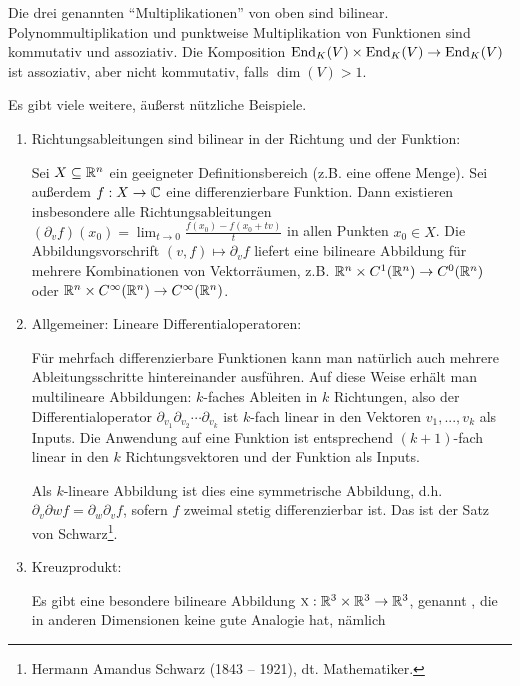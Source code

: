\begin{example}
Die drei genannten \enquote{Multiplikationen} von oben sind bilinear. Polynommultiplikation und punktweise Multiplikation von Funktionen sind kommutativ und assoziativ. Die Komposition $\operatorname{End}_K(V)\times\operatorname{End}_K(V)\to\operatorname{End}_K(V)$ ist assoziativ, aber nicht kommutativ, falls $\dim(V) > 1$.

Es gibt viele weitere, äußerst nützliche Beispiele.
\begin{enumerate}[start=4]
	\item Richtungsableitungen sind bilinear in der Richtung und der Funktion:
	
	 Sei $X\subseteq\mathbb{R}^n$ ein geeigneter Definitionsbereich (z.B. eine offene Menge). Sei außerdem $f:X \to\mathbb{C}$ eine differenzierbare Funktion. Dann existieren insbesondere alle Richtungsableitungen $(\partial_vf)(x_0) = \lim_{t\to 0} \frac{f(x_0)-f(x_0+tv)}{t}$ in allen Punkten $x_0\in X$. Die Abbildungsvorschrift $(v,f) \mapsto \partial_v f$ liefert eine bilineare Abbildung für mehrere Kombinationen von Vektorräumen, z.B. $\mathbb{R}^n \times C^1(\mathbb{R}^n) \to C^0(\mathbb{R}^n)$ oder $\mathbb{R}^n \times C^\infty(\mathbb{R}^n) \to C^\infty(\mathbb{R}^n)$.
     
     \item Allgemeiner: Lineare Differentialoperatoren:
     
     Für mehrfach differenzierbare Funktionen kann man natürlich auch mehrere Ableitungsschritte hintereinander ausführen. Auf diese Weise erhält man multilineare Abbildungen: $k$-faches Ableiten in $k$ Richtungen, also der Differentialoperator $\partial_{v_1} \partial_{v_2} \cdots \partial_{v_k}$ ist $k$-fach linear in den Vektoren $v_1, ..., v_k$ als Inputs. Die Anwendung auf eine Funktion ist entsprechend $(k+1)$-fach linear in den $k$ Richtungsvektoren und der Funktion als Inputs.
     
     Als $k$-lineare Abbildung ist dies eine symmetrische Abbildung, d.h. $\partial_v \partial w f = \partial_w\partial_v f$, sofern $f$ zweimal stetig differenzierbar ist. Das ist der Satz von Schwarz\footnote{Hermann Amandus Schwarz (1843 -- 1921), dt. Mathematiker.}.
     
     \item Kreuzprodukt:
     
     Es gibt eine besondere bilineare Abbildung $\textsc{x} : \mathbb{R}^3 \times \mathbb{R}^3 \to \mathbb{R}^3$, genannt , die in anderen Dimensionen keine gute Analogie hat, nämlich
     

\end{enumerate}
\end{example}

